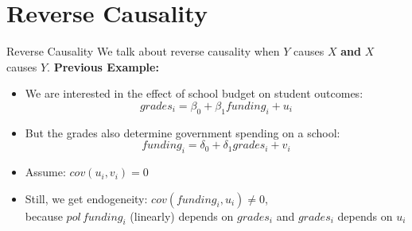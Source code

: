 \documentclass[11pt, aspectratio = 169]{beamer}
\begin{document}
\section{Reverse Causality}

\begin{frame}{Reverse Causality}
We talk about reverse causality when $Y$ causes $X$ \textbf{and} $X$ causes $Y$.
\pause
\textbf{Previous Example:} \\
\begin{itemize}
    \item  We are interested in the effect of school budget on student outcomes: $$grades_i = \beta_0 + \beta_1 funding_i + u_i$$

\item But the grades also determine government spending on a school: $$funding_i = \delta_0 + \delta_1 grades_i + v_i$$ 

\item Assume: $cov(u_i, v_i ) = 0$

\item Still, we get endogeneity: $cov(funding_i, u_i ) \neq 0$, \\
because $pol \,funding_i$ (linearly) depends on $grades_i $ and $grades_i$ depends on $u_i$ 
\end{itemize}
\end{frame}
\end{document}
